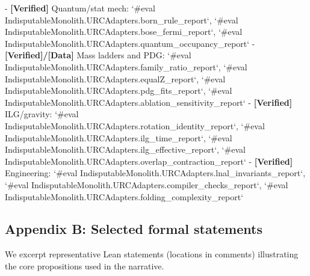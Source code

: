 \documentclass[11pt,a4paper,twoside]{article}
\numberwithin{equation}{section}
\theoremstyle{customthm}
\theoremstyle{customdef}
\theoremstyle{customrem}
\begin{document}
  - \textbf{[Verified]} Quantum/stat mech: `#eval IndisputableMonolith.URCAdapters.born_rule_report`, `#eval IndisputableMonolith.URCAdapters.bose_fermi_report`, `#eval IndisputableMonolith.URCAdapters.quantum_occupancy_report`
  - \textbf{[Verified]/[Data]} Mass ladders and PDG: `#eval IndisputableMonolith.URCAdapters.family_ratio_report`, `#eval IndisputableMonolith.URCAdapters.equalZ_report`, `#eval IndisputableMonolith.URCAdapters.pdg_fits_report`, `#eval IndisputableMonolith.URCAdapters.ablation_sensitivity_report`
  - \textbf{[Verified]} ILG/gravity: `#eval IndisputableMonolith.URCAdapters.rotation_identity_report`, `#eval IndisputableMonolith.URCAdapters.ilg_time_report`, `#eval IndisputableMonolith.URCAdapters.ilg_effective_report`, `#eval IndisputableMonolith.URCAdapters.overlap_contraction_report`
  - \textbf{[Verified]} Engineering: `#eval IndisputableMonolith.URCAdapters.lnal_invariants_report`, `#eval IndisputableMonolith.URCAdapters.compiler_checks_report`, `#eval IndisputableMonolith.URCAdapters.folding_complexity_report`

\subsection*{Appendix B: Selected formal statements}\label{app:formal}
We excerpt representative Lean statements (locations in comments) illustrating the core propositions used in the narrative.
\end{document}
